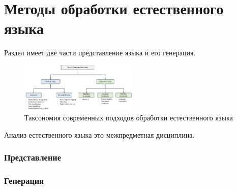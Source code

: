 \chapter{Методы обработки естественного языка}

Раздел имеет две части представление языка и его генерация.

\begin{figure}[h]
    \centering
    \includegraphics[width=0.5\textwidth]{assets/llm/taxonomy.png}
    \caption{Таксономия современных подходов обработки естественного языка}
    \label{llm_taxonomy}
\end{figure}

Анализ естественного языка это межпредметная дисциплина.


\subsection{Представление}


\subsection{Генерация}

